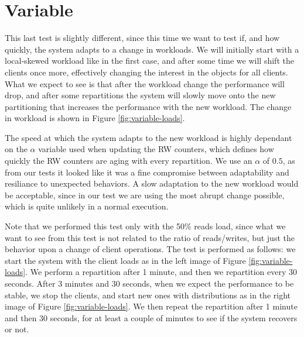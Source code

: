 \section{Variable}\label{sec:variable}
This last test is slightly different, since this time we want to test if, and how quickly, the system adapts to a change in workloads. We will initially start with a local-skewed workload like in the first case, and after some time we will shift the clients once more, effectively changing the interest in the objects for all clients. What we expect to see is that after the workload change the performance will drop, and after some repartitions the system will slowly move onto the new partitioning that increases the performance with the new workload. The change in workload is shown in Figure \ref{fig:variable-loads}.

The speed at which the system adapts to the new workload is highly dependant on the $\alpha$ variable used when updating the RW counters, which defines how quickly the RW counters are aging with every repartition. We use an $\alpha$ of $0.5$, as from our tests it looked like it was a fine compromise between adaptability and resiliance to unexpected behaviors. A slow adaptation to the new workload would be acceptable, since in our test we are using the most abrupt change possible, which is quite unlikely in a normal execution.

Note that we performed this test only with the 50\% reads load, since what we want to see from this test is not related to the ratio of reads/writes, but just the behavior upon a change of client operations. The test is performed as follows: we start the system with the client loads as in the left image of Figure \ref{fig:variable-loads}. We perform a repartition after 1 minute, and then we repartition every 30 seconds. After 3 minutes and 30 seconds, when we expect the performance to be stable, we stop the clients, and start new ones with distributions as in the right image of Figure \ref{fig:variable-loads}. We then repeat the repartition after 1 minute and then 30 seconds, for at least a couple of minutes to see if the system recovers or not.

